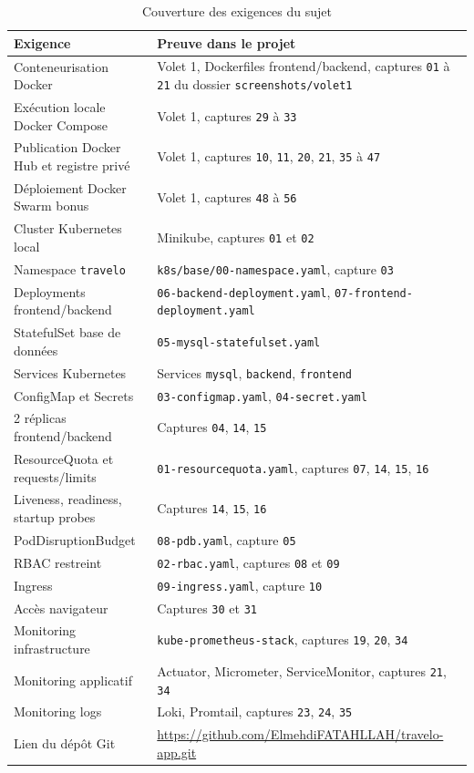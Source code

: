 \documentclass[11pt,a4paper]{article}
\begin{document}
\begin{table}[H]
\centering
\begin{tabular}{|p{}|p{}|}
\hline
\textbf{Exigence} & \textbf{Preuve dans le projet} \\
\hline
Conteneurisation Docker & Volet 1, Dockerfiles frontend/backend, captures \texttt{01} à \texttt{21} du dossier \texttt{screenshots/volet1} \\
\hline
Exécution locale Docker Compose & Volet 1, captures \texttt{29} à \texttt{33} \\
\hline
Publication Docker Hub et registre privé & Volet 1, captures \texttt{10}, \texttt{11}, \texttt{20}, \texttt{21}, \texttt{35} à \texttt{47} \\
\hline
Déploiement Docker Swarm bonus & Volet 1, captures \texttt{48} à \texttt{56} \\
\hline
Cluster Kubernetes local & Minikube, captures \texttt{01} et \texttt{02} \\
\hline
Namespace \texttt{travelo} & \texttt{k8s/base/00-namespace.yaml}, capture \texttt{03} \\
\hline
Deployments frontend/backend & \texttt{06-backend-deployment.yaml}, \texttt{07-frontend-deployment.yaml} \\
\hline
StatefulSet base de données & \texttt{05-mysql-statefulset.yaml} \\
\hline
Services Kubernetes & Services \texttt{mysql}, \texttt{backend}, \texttt{frontend} \\
\hline
ConfigMap et Secrets & \texttt{03-configmap.yaml}, \texttt{04-secret.yaml} \\
\hline
2 réplicas frontend/backend & Captures \texttt{04}, \texttt{14}, \texttt{15} \\
\hline
ResourceQuota et requests/limits & \texttt{01-resourcequota.yaml}, captures \texttt{07}, \texttt{14}, \texttt{15}, \texttt{16} \\
\hline
Liveness, readiness, startup probes & Captures \texttt{14}, \texttt{15}, \texttt{16} \\
\hline
PodDisruptionBudget & \texttt{08-pdb.yaml}, capture \texttt{05} \\
\hline
RBAC restreint & \texttt{02-rbac.yaml}, captures \texttt{08} et \texttt{09} \\
\hline
Ingress & \texttt{09-ingress.yaml}, capture \texttt{10} \\
\hline
Accès navigateur & Captures \texttt{30} et \texttt{31} \\
\hline
Monitoring infrastructure & \texttt{kube-prometheus-stack}, captures \texttt{19}, \texttt{20}, \texttt{34} \\
\hline
Monitoring applicatif & Actuator, Micrometer, ServiceMonitor, captures \texttt{21}, \texttt{34} \\
\hline
Monitoring logs & Loki, Promtail, captures \texttt{23}, \texttt{24}, \texttt{35} \\
\hline
Lien du dépôt Git & \url{https://github.com/ElmehdiFATAHLLAH/travelo-app.git} \\
\hline
\end{tabular}
\caption{Couverture des exigences du sujet}
\end{table}
\end{document}
